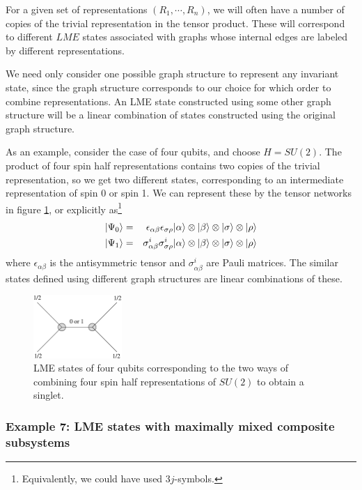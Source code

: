 \documentclass[12pt]{article}
\theoremstyle{definition}
\newcommand{\bea}{\begin{eqnarray}}
\newcommand{\eea}{\end{eqnarray}}
\begin{document}
For a given set of representations $(R_1, \cdots, R_n)$, we will often have a number of copies of the trivial representation in the tensor product. These will correspond to different $LME$ states associated with graphs whose internal edges are labeled by different representations.

We need only consider one possible graph structure to represent any invariant state, since the graph structure corresponds to our choice for which order to combine representations. An LME state constructed using some other graph structure will be a linear combination of states constructed using the original graph structure.

As an example, consider the case of four qubits, and choose $H = SU(2)$. The product of four spin half representations contains two copies of the trivial representation, so we get two different states, corresponding to an intermediate representation of spin 0 or spin 1. We can represent these by the tensor networks in figure \ref{qubit4simple}, or explicitly as\footnote{Equivalently, we could have used $3j$-symbols.}
\bea
|\Psi_0 \rangle &=& \epsilon_{\alpha \beta} \epsilon_{\sigma \rho} | \alpha \rangle  \otimes |\beta \rangle  \otimes |\sigma \rangle  \otimes |\rho \rangle \cr
|\Psi_1 \rangle &=& \sigma^i_{\alpha \beta} \sigma^i_{\sigma \rho} | \alpha \rangle  \otimes |\beta \rangle  \otimes |\sigma \rangle  \otimes |\rho \rangle
\eea
where $\epsilon_{\alpha \beta}$ is the antisymmetric tensor and $\sigma^i_{\alpha \beta}$ are Pauli matrices. The similar states defined using different graph structures are linear combinations of these.

\begin{figure}
\centering
\includegraphics[width=0.3\textwidth]{qubit4simple.eps}
\caption{LME states of four qubits corresponding to the two ways of combining four spin half representations of $SU(2)$ to obtain a singlet.}
\label{qubit4simple}
\end{figure}


\subsubsection*{Example 7: LME states with maximally mixed composite subsystems}
\end{document}
